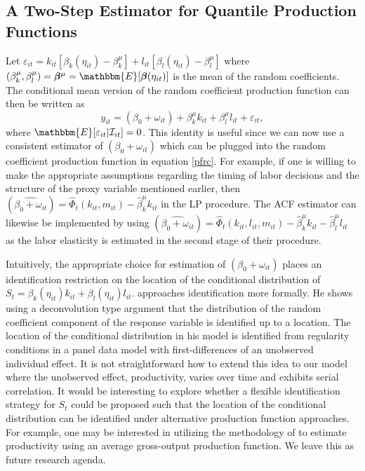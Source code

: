 \documentclass[11pt]{article}
\begin{document}
\subsection{A Two-Step Estimator for Quantile Production Functions}
Let $\varepsilon_{it}=k_{it}[\beta_{k}(\eta_{it})-\beta^{\mu}_{k}]+l_{it}[\beta_{l}(\eta_{it})-\beta^{\mu}_{l}]$ where $(\beta_{k}^{\mu}, \beta_{l}^{\mu})=\boldsymbol{\beta}^{\mu}=\mathbbm{E}[\boldsymbol{\beta}(\eta_{it})]$ is the mean of the random coefficients. The conditional mean version of the random coefficient production function can then be written as
\begin{equation}
y_{it}=(\beta_{0}+\omega_{it})+\beta_{k}^{\mu}k_{it}+\beta_{l}^{\mu}l_{it}+\varepsilon_{it},
\end{equation}
where $\mathbbm{E}[\varepsilon_{it}|\mathcal{I}_{it}]=0$. This identity is useful since we can now use a consistent estimator of $(\beta_{0}+\omega_{it})$ which can be plugged into the random coefficient production function in equation \eqref{pfrc}. For example, if one is willing to make the appropriate assumptions regarding the timing of labor decisions and the structure of the proxy variable mentioned earlier, then $(\widehat{\beta_{0}+\omega_{it}})=\hat{\Phi}_{t}(k_{it}, m_{it})-\hat{\beta}_{k}^{\mu}k_{it}$ in the LP procedure. The ACF estimator can likewise be implemented by using  $(\widehat{\beta_{0}+\omega_{it}})=\hat{\Phi}_{t}(k_{it}, l_{it}, m_{it})-\hat{\beta}_{k}^{\mu}k_{it}-\hat{\beta}_{l}^{\mu}l_{it}$ as the labor elasticity is estimated in the second stage of their procedure.

Intuitively, the appropriate choice for estimation of $(\beta_{0}+\omega_{it})$ places an identification restriction on the location of the conditional distribution of $S_{t}=\beta_{k}(\eta_{it})k_{it}+\beta_{l}(\eta_{it})l_{it}$. \cite{Canay2011} approaches identification more formally. He shows using a deconvolution type argument that the distribution of the random coefficient component of the response variable is identified up to a location. The location of the conditional distribution in his model is identified from regularity conditions in a panel data model with first-differences of an unobserved individual effect. It is not straightforward how to extend this idea to our model where the unobserved effect, productivity, varies over time and exhibits serial correlation. It would be interesting to explore whether a flexible identification strategy for $S_{t}$ could be proposed such that the location of the conditional distribution can be identified under alternative production function approaches. For example, one may be interested in utilizing the methodology of \cite{Gandhi2020} to estimate productivity using an average gross-output production function. We leave this as future research agenda.
\end{document}
